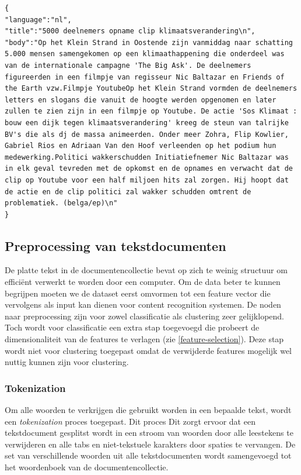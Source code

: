 \begin{lstlisting}[caption=bjorn,label=lst:plaintext]
{
"language":"nl",
"title":"5000 deelnemers opname clip klimaatsverandering\n",
"body":"Op het Klein Strand in Oostende zijn vanmiddag naar schatting 5.000 mensen samengekomen op een klimaathappening die onderdeel was van de internationale campagne 'The Big Ask'. De deelnemers figureerden in een filmpje van regisseur Nic Baltazar en Friends of the Earth vzw.Filmpje YoutubeOp het Klein Strand vormden de deelnemers letters en slogans die vanuit de hoogte werden opgenomen en later zullen te zien zijn in een filmpje op Youtube. De actie 'Sos Klimaat : bouw een dijk tegen klimaatsverandering' kreeg de steun van talrijke BV's die als dj de massa animeerden. Onder meer Zohra, Flip Kowlier, Gabriel Rios en Adriaan Van den Hoof verleenden op het podium hun medewerking.Politici wakkerschudden Initiatiefnemer Nic Baltazar was in elk geval tevreden met de opkomst en de opnames en verwacht dat de clip op Youtube voor een half miljoen hits zal zorgen. Hij hoopt dat de actie en de clip politici zal wakker schudden omtrent de problematiek. (belga/ep)\n"
}
\end{lstlisting} 

\subsection{Preprocessing van tekstdocumenten}\label{bag-of-words}\label{preprocessing}
De platte tekst in de documentencollectie bevat op zich te weinig structuur om effici\"ent verwerkt te worden door een computer. Om de data beter te kunnen begrijpen moeten we de dataset eerst omvormen tot een feature vector die vervolgens als input kan dienen voor content recognition systemen. De noden naar preprocessing zijn voor zowel classificatie als clustering zeer gelijklopend. Toch wordt voor classificatie een extra stap toegevoegd die probeert de dimensionaliteit van de features te verlagen (zie \ref{feature-selection}). Deze stap wordt niet voor clustering toegepast omdat de verwijderde features mogelijk wel nuttig kunnen zijn voor clustering.

\subsubsection{Tokenization}
Om alle woorden te verkrijgen die gebruikt worden in een bepaalde tekst, wordt een \textit{tokenization}\label{tokenization} proces toegepast. Dit proces Dit zorgt ervoor dat een tekstdocument gesplitst wordt in een stroom van woorden door alle leestekens te verwijderen en alle tabs en niet-tekstuele karakters door spaties te vervangen. De set van verschillende woorden uit alle tekstdocumenten wordt samengevoegd tot het woordenboek van de documentencollectie. 

